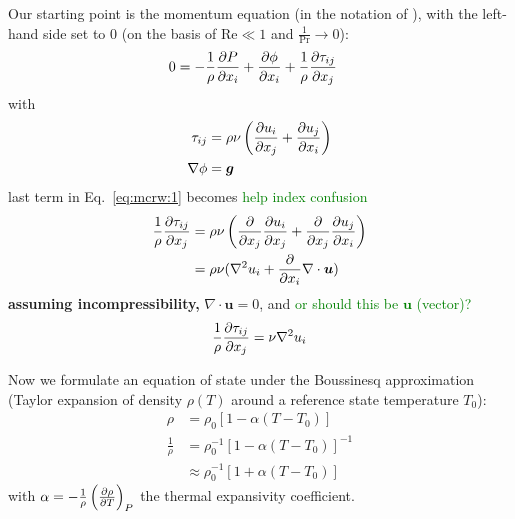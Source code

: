\documentclass[document.tex]{subfiles}
\begin{document}
\begin{mdframed} 
    Our starting point is the momentum equation (in the notation of \cite{mcrw74}), with the left-hand side set to 0 (on the basis of $\mathrm{Re} \ll 1$ and $\frac{1}{\mathrm{Pr}}\to 0$):
    \begin{align} \label{eq:mcrw:1}
        0 &= -\frac{1}{\rho} \pdv{P}{x_i} + \pdv{\phi}{x_i} + \frac{1}{\rho}\pdv{\tau_{ij}}{x_j}
    \end{align}
    with 
    \begin{align*}
        \tau_{ij} &= \rho \nu\left(\pdv{u_i}{x_j} + \pdv{u_j}{x_i}\right) \\
        \nabla\phi &= \bm{g}
    \end{align*}
    last term in Eq.~\eqref{eq:mcrw:1} becomes \textcolor{green}{help index confusion}
    \begin{align*}
        \frac{1}{\rho}\pdv{\tau_{ij}}{x_j} &= \rho \nu \left(\pdv{x_j}\pdv{u_i}{x_j}+\pdv{x_j}\pdv{u_j}{x_i}\right) \\
        &= \rho \nu (\nabla^2u_i+ \pdv{x_i}\nabla \cdot \bm{u}) \\
    \end{align*}
    \textbf{assuming incompressibility,} $\nabla \cdot \bm{u} = 0$, and \textcolor{green}{or should this be $\bm{u}$ (vector)?}
    \begin{align} 
        \frac{1}{\rho}\pdv{\tau_{ij}}{x_j} = \nu \nabla^2 u_i
    \end{align}

    Now we formulate an equation of state under the Boussinesq approximation (Taylor expansion of density $\rho(T)$ around a reference state temperature $T_0$): 
    \begin{align*}
        \rho &= \rho_0[1-\alpha (T-T_0)] \\
        \frac{1}{\rho} &= \rho_0^{-1}[1-\alpha (T-T_0)]^{-1} \\
        &\approx \rho_0^{-1}[1+\alpha (T-T_0)]
    \end{align*}
    with $\alpha = -\frac{1}{\rho}\left(\pdv{\rho}{T}\right)_P$ the thermal expansivity coefficient. 


\end{mdframed}
\end{document}
